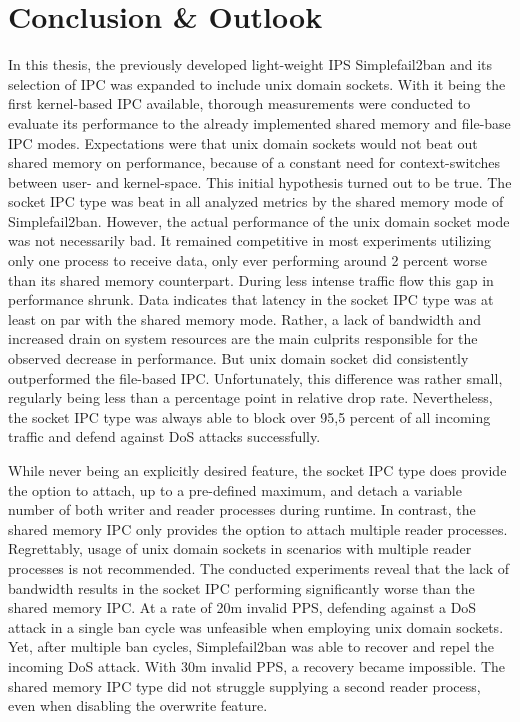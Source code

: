 %
%

\chapter{Conclusion \& Outlook}
In this thesis, the previously developed light-weight \ac{IPS} Simplefail2ban and its selection of \ac{IPC} was expanded to include unix domain sockets.
With it being the first kernel-based \ac{IPC} available, thorough measurements were conducted to evaluate its performance to the already implemented shared memory and file-base \ac{IPC} modes.
Expectations were that unix domain sockets would not beat out shared memory on performance, because of a constant need for context-switches between user- and kernel-space.
This initial hypothesis turned out to be true.
The socket \ac{IPC} type was beat in all analyzed metrics by the shared memory mode of Simplefail2ban.
However, the actual performance of the unix domain socket mode was not necessarily bad.
It remained competitive in most experiments utilizing only one process to receive data, only ever performing around 2 percent worse than its shared memory counterpart.
During less intense traffic flow this gap in performance shrunk.
Data indicates that latency in the socket \ac{IPC} type was at least on par with the shared memory mode.
Rather, a lack of bandwidth and increased drain on system resources are the main culprits responsible for the observed decrease in performance.
But unix domain socket did consistently outperformed the file-based \ac{IPC}.
Unfortunately, this difference was rather small, regularly being less than a percentage point in relative drop rate.
Nevertheless, the socket \ac{IPC} type was always able to block over 95,5 percent of all incoming traffic and defend against \ac{DoS} attacks successfully.

While never being an explicitly desired feature, the socket \ac{IPC} type does provide the option to attach, up to a pre-defined maximum, and detach a variable number of both writer and reader processes during runtime.
In contrast, the shared memory \ac{IPC} only provides the option to attach multiple reader processes.
Regrettably, usage of unix domain sockets in scenarios with multiple reader processes is not recommended.
The conducted experiments reveal that the lack of bandwidth results in the socket \ac{IPC} performing significantly worse than the shared memory \ac{IPC}.
At a rate of 20m invalid \ac{PPS}, defending against a \ac{DoS} attack in a single ban cycle was unfeasible when employing unix domain sockets.
Yet, after multiple ban cycles, Simplefail2ban was able to recover and repel the incoming \ac{DoS} attack.
With 30m invalid \ac{PPS}, a recovery became impossible.
The shared memory \ac{IPC} type did not struggle supplying a second reader process, even when disabling the overwrite feature.

